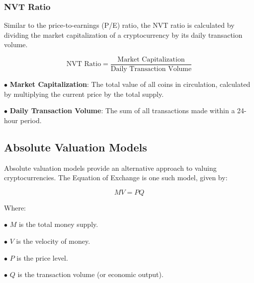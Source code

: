 \subsubsection{NVT Ratio}

Similar to the price-to-earnings (P/E) ratio, the NVT ratio is calculated by dividing the market capitalization of a cryptocurrency by its daily transaction volume.

\begin{equation}\label{eq:nvt_ratio}
\text{NVT Ratio} = \frac{\text{Market Capitalization}}{\text{Daily Transaction Volume}}
\end{equation}


$ \bullet $ \textbf{Market Capitalization}: The total value of all coins in circulation, calculated by multiplying the current price by the total supply.

$ \bullet $  \textbf{Daily Transaction Volume}: The sum of all transactions made within a 24-hour period.

\subsection{Absolute Valuation Models}

Absolute valuation models provide an alternative approach to valuing cryptocurrencies. The Equation of Exchange is one such model, given by:

\begin{equation}\label{eq:equation_of_exchange}
MV = PQ
\end{equation}

Where:

$ \bullet $  $M$ is the total money supply.

$ \bullet $  $V$ is the velocity of money.

$ \bullet $ $P$ is the price level.

$ \bullet $ $Q$ is the transaction volume (or economic output).